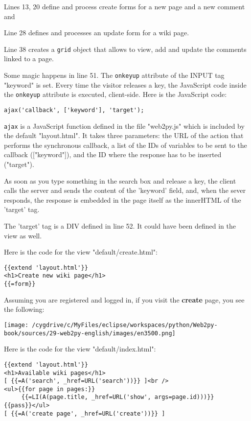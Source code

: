 \documentclass[justified,sixbynine,notoc]{tufte-book}
\def\ft{\small\tt}
\begin{document}
\begin{fullwidth}
Lines 13, 20 define and process create forms for a new page and a new comment and

Line 28 defines and processes an update form for a wiki page.

Line 38 creates a {\ft grid} object that allows to view, add and update the comments linked to a page.

Some magic happens in line 51. The {\ft onkeyup} attribute of the INPUT tag "keyword" is set. Every time the visitor releases a key, the JavaScript code inside the {\ft onkeyup} attribute is executed, client-side. Here is the JavaScript code:
\begin{lstlisting}
ajax('callback', ['keyword'], 'target');
\end{lstlisting}
{\ft ajax} is a JavaScript function defined in the file "web2py.js" which is included by the default "layout.html". It takes three parameters: the URL of the action that performs the synchronous callback, a list of the IDs of variables to be sent to the callback (["keyword"]), and the ID where the response has to be inserted ("target").

As soon as you type something in the search box and release a key, the client calls the server and sends the content of the 'keyword' field, and, when the sever responds, the response is embedded in the page itself as the innerHTML of the 'target' tag.

The 'target' tag is a DIV defined in line 52. It could have been defined in the view as well.

Here is the code for the view "default/create.html":
\begin{lstlisting}[keywords={}]
{{extend 'layout.html'}}
<h1>Create new wiki page</h1>
{{=form}}
\end{lstlisting}

Assuming you are registered and logged in, if you visit the {\bf create} page, you see the following:


\goodbreak\begin{center}\texttt{[image: /cygdrive/c/MyFiles/eclipse/workspaces/python/Web2py-book/sources/29-web2py-english/images/en3500.png]}\end{center}


Here is the code for the view "default/index.html":
\begin{lstlisting}[keywords={}]
{{extend 'layout.html'}}
<h1>Available wiki pages</h1>
[ {{=A('search', _href=URL('search'))}} ]<br />
<ul>{{for page in pages:}}
     {{=LI(A(page.title, _href=URL('show', args=page.id)))}}
{{pass}}</ul>
[ {{=A('create page', _href=URL('create'))}} ]
\end{lstlisting}


\end{fullwidth}
\end{document}
